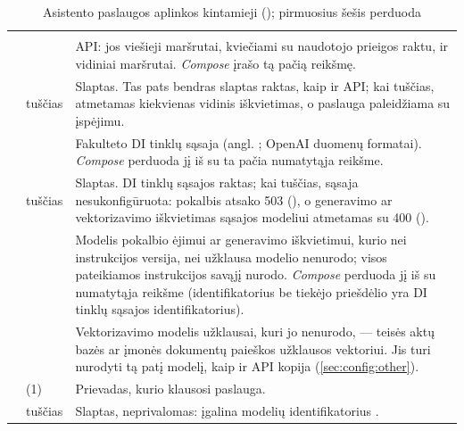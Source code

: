 \begin{xltabular}{\textwidth}{@{}L{38mm}L{40mm}Y@{}}
\caption{Asistento paslaugos aplinkos kintamieji (); pirmuosius
šešis perduoda }\label{tab:config:assistant}\\
\toprule
{} &  &  \\
\midrule
\endfirsthead
\toprule
{} &  &  \\
\midrule
\endhead
\bottomrule
\endlastfoot
{} &  & API: jos viešieji maršrutai, kviečiami su naudotojo prieigos raktu, ir vidiniai maršrutai. \textit{Compose} įrašo tą pačią reikšmę. \\
 & tuščias & Slaptas. Tas pats bendras slaptas raktas, kaip ir API; kai tuščias, atmetamas kiekvienas vidinis iškvietimas, o paslauga paleidžiama su įspėjimu. \\
 &  & Fakulteto DI tinklų sąsaja (angl. ; OpenAI duomenų formatai). \textit{Compose} perduoda jį iš  su ta pačia numatytąja reikšme. \\
 & tuščias & Slaptas. DI tinklų sąsajos raktas; kai tuščias, sąsaja nesukonfigūruota: pokalbis atsako 503 (), o generavimo ar vektorizavimo iškvietimas sąsajos modeliui atmetamas su 400 (). \\
 &  & Modelis pokalbio ėjimui ar generavimo iškvietimui, kurio nei instrukcijos versija, nei užklausa modelio nenurodo; visos pateikiamos instrukcijos savąjį nurodo. \textit{Compose} perduoda jį iš  su numatytąja reikšme  (identifikatorius be tiekėjo priešdėlio yra DI tinklų sąsajos identifikatorius). \\
 &  & Vektorizavimo modelis užklausai, kuri jo nenurodo, --- teisės aktų bazės ar įmonės dokumentų paieškos užklausos vektoriui. Jis turi nurodyti tą patį modelį, kaip ir API kopija (\cref{sec:config:other}). \\
 &  (1) & Prievadas, kurio klausosi paslauga. \\
 & tuščias & Slaptas, neprivalomas: įgalina modelių identifikatorius . \\

\end{xltabular}
